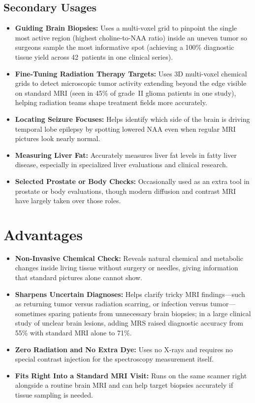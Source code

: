 \subsection{Secondary Usages}
\begin{itemize}
\item \textbf{Guiding Brain Biopsies:} Uses a multi-voxel grid to pinpoint the single most active region (highest choline-to-NAA ratio) inside an uneven tumor so surgeons sample the most informative spot (achieving a 100\% diagnostic tissue yield across 42~patients in one clinical series).
\item \textbf{Fine-Tuning Radiation Therapy Targets:} Uses 3D multi-voxel chemical grids to detect microscopic tumor activity extending beyond the edge visible on standard MRI (seen in 45\% of grade~II glioma patients in one study), helping radiation teams shape treatment fields more accurately.
\item \textbf{Locating Seizure Focuses:} Helps identify which side of the brain is driving temporal lobe epilepsy by spotting lowered NAA even when regular MRI pictures look nearly normal.
\item \textbf{Measuring Liver Fat:} Accurately measures liver fat levels in fatty liver disease, especially in specialized liver evaluations and clinical research.
\item \textbf{Selected Prostate or Body Checks:} Occasionally used as an extra tool in prostate or body evaluations, though modern diffusion and contrast MRI have largely taken over those roles.
\end{itemize}

\section{Advantages}
\begin{itemize}
\item \textbf{Non-Invasive Chemical Check:} Reveals natural chemical and metabolic changes inside living tissue without surgery or needles, giving information that standard pictures alone cannot show.
\item \textbf{Sharpens Uncertain Diagnoses:} Helps clarify tricky MRI findings---such as returning tumor versus radiation scarring, or infection versus tumor---sometimes sparing patients from unnecessary brain biopsies; in a large clinical study of unclear brain lesions, adding MRS raised diagnostic accuracy from 55\% with standard MRI alone to 71\%.
\item \textbf{Zero Radiation and No Extra Dye:} Uses no X-rays and requires no special contrast injection for the spectroscopy measurement itself.
\item \textbf{Fits Right Into a Standard MRI Visit:} Runs on the same scanner right alongside a routine brain MRI and can help target biopsies accurately if tissue sampling is needed.
\end{itemize}

